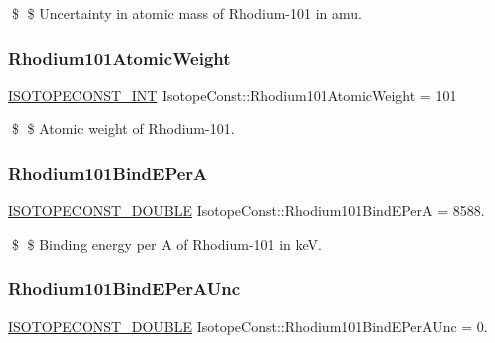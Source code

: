 \$ \$ Uncertainty in atomic mass of Rhodium-\/101 in amu. \mbox{\label{group___isotope_const-_rhodium-_rh101_ga79d913734eb317ce18fe24cd62f9b3a8}} 
\subsubsection{\texorpdfstring{Rhodium101\+Atomic\+Weight}{Rhodium101AtomicWeight}}
{\footnotesize\ttfamily \mbox{\hyperlink{group___isotope_const-_macros_ga5f18360b3e99483a35c32d789e62621c}{I\+S\+O\+T\+O\+P\+E\+C\+O\+N\+S\+T\+\_\+\+I\+NT}} Isotope\+Const\+::\+Rhodium101\+Atomic\+Weight = 101}

\$ \$ Atomic weight of Rhodium-\/101. \mbox{\label{group___isotope_const-_rhodium-_rh101_ga7b82aaa16ac61b1b1ebdeb05f2ff2b47}} 
\subsubsection{\texorpdfstring{Rhodium101\+Bind\+E\+PerA}{Rhodium101BindEPerA}}
{\footnotesize\ttfamily \mbox{\hyperlink{group___isotope_const-_macros_ga8f45a7272ce02c0b4c65c44636ed719a}{I\+S\+O\+T\+O\+P\+E\+C\+O\+N\+S\+T\+\_\+\+D\+O\+U\+B\+LE}} Isotope\+Const\+::\+Rhodium101\+Bind\+E\+PerA = 8588.}

\$ \$ Binding energy per A of Rhodium-\/101 in keV. \mbox{\label{group___isotope_const-_rhodium-_rh101_ga61b5544fa549267f47d44358c5d1b055}} 
\subsubsection{\texorpdfstring{Rhodium101\+Bind\+E\+Per\+A\+Unc}{Rhodium101BindEPerAUnc}}
{\footnotesize\ttfamily \mbox{\hyperlink{group___isotope_const-_macros_ga8f45a7272ce02c0b4c65c44636ed719a}{I\+S\+O\+T\+O\+P\+E\+C\+O\+N\+S\+T\+\_\+\+D\+O\+U\+B\+LE}} Isotope\+Const\+::\+Rhodium101\+Bind\+E\+Per\+A\+Unc = 0.}

